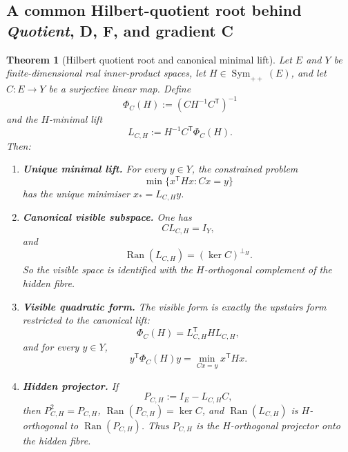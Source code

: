\documentclass[11pt,a4paper]{article}
\numberwithin{equation}{section}
\DeclareMathOperator{\Ran}{Ran}
\DeclareMathOperator{\Sym}{Sym}
\theoremstyle{thmcompact}
\newtheorem{theorem}{Theorem}[section]
\theoremstyle{remark}
\begin{document}
\subsection{A common Hilbert-quotient root behind \emph{Quotient}, D, F, and gradient C}

\begin{theorem}[Hilbert quotient root and canonical minimal lift]\label{thm:hilbert-quotient-root}
Let $E$ and $Y$ be finite-dimensional real inner-product spaces, let $H \in \Sym_{++}(E)$, and let $C : E \to Y$ be a surjective linear map. Define
\begin{equation}\label{eq:hilbert-quotient-phi}
\Phi_C(H):=(CH^{-1}C^{\mathsf T})^{-1}
\end{equation}
and the $H$-minimal lift
\begin{equation}\label{eq:hilbert-quotient-lift}
L_{C,H}:=H^{-1}C^{\mathsf T}\Phi_C(H).
\end{equation}
Then:
\begin{enumerate}[label=\textup{(\roman*)}]
\item \textbf{Unique minimal lift.} For every $y \in Y$, the constrained problem
\begin{equation}\label{eq:hilbert-quotient-primal}
\min\{x^{\mathsf T}Hx : Cx=y\}
\end{equation}
has the unique minimiser $x_*=L_{C,H}y$.

\item \textbf{Canonical visible subspace.} One has
\begin{equation}\label{eq:hilbert-quotient-right-inverse}
CL_{C,H}=I_Y,
\end{equation}
and
\begin{equation}\label{eq:hilbert-quotient-range}
\Ran(L_{C,H})=(\ker C)^{\perp_H}.
\end{equation}
So the visible space is identified with the $H$-orthogonal complement of the hidden fibre.

\item \textbf{Visible quadratic form.} The visible form is exactly the upstairs form restricted to the canonical lift:
\begin{equation}\label{eq:hilbert-quotient-pullback}
\Phi_C(H)=L_{C,H}^{\mathsf T}HL_{C,H},
\end{equation}
and for every $y \in Y$,
\begin{equation}\label{eq:hilbert-quotient-min-value}
y^{\mathsf T}\Phi_C(H)y=\min_{Cx=y} x^{\mathsf T}Hx.
\end{equation}

\item \textbf{Hidden projector.} If
\begin{equation}\label{eq:hilbert-quotient-projector}
P_{C,H}:=I_E-L_{C,H}C,
\end{equation}
then $P_{C,H}^2=P_{C,H}$, $\Ran(P_{C,H})=\ker C$, and $\Ran(L_{C,H})$ is $H$-orthogonal to $\Ran(P_{C,H})$. Thus $P_{C,H}$ is the $H$-orthogonal projector onto the hidden fibre.
\end{enumerate}
\end{theorem}
\end{document}

